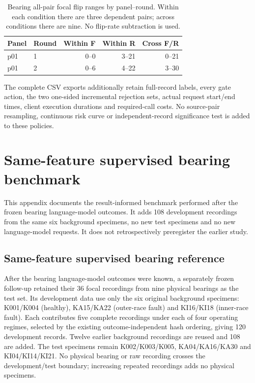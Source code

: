 \documentclass[11pt,a4paper]{article}
\begin{document}
\begin{table}[htbp]\centering\small
\caption{Bearing all-pair focal flip ranges by panel--round. Within each condition there are three dependent pairs; across conditions there are nine. No flip-rate subtraction is used.}
\label{tab:policy_flips_paderborn}
\begin{tabular}{@{}llrrr@{}}\toprule
Panel & Round & Within F & Within R & Cross F/R \\\midrule
p01 & 1 & 0--0 & 3--21 & 0--21 \\
p01 & 2 & 0--6 & 4--22 & 3--30 \\
\bottomrule\end{tabular}\end{table}

\FloatBarrier

The complete CSV exports additionally retain full-record labels, every gate action, the two one-sided incremental rejection sets, actual request start/end times, client execution durations and required-call costs. No source-pair resampling, continuous risk curve or independent-record significance test is added to these policies.
\section{Same-feature supervised bearing benchmark}

\label{sec:bearing_baseline_supp}

This appendix documents the result-informed benchmark performed after the frozen bearing language-model outcomes. It adds 108 development recordings from the same six background specimens, no new test specimens and no new language-model requests. It does not retrospectively preregister the earlier study.

\subsection{Same-feature supervised bearing reference}
After the bearing language-model outcomes were known, a separately frozen follow-up retained their 36 focal recordings from nine physical bearings as the test set. Its development data use only the six original background specimens: K001/K004 (healthy), KA15/KA22 (outer-race fault) and KI16/KI18 (inner-race fault). Each contributes five complete recordings under each of four operating regimes, selected by the existing outcome-independent hash ordering, giving 120 development records. Twelve earlier background recordings are reused and 108 are added. The test specimens remain K002/K003/K005, KA04/KA16/KA30 and KI04/KI14/KI21. No physical bearing or raw recording crosses the development/test boundary; increasing repeated recordings adds no physical specimens.
\end{document}
